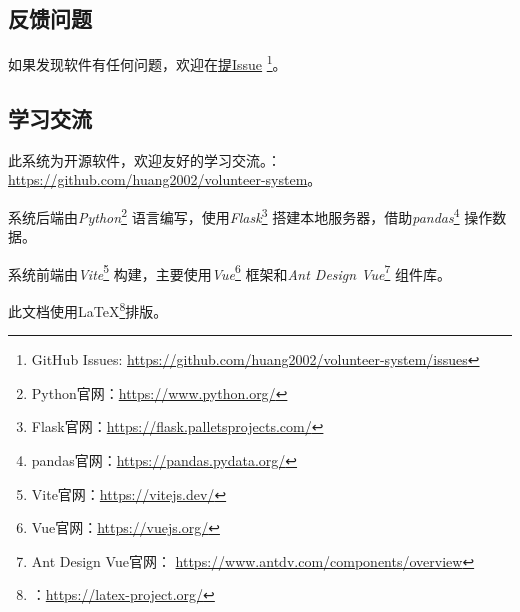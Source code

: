 \documentclass[12pt,titlepage]{article}
\newcommand{\githuburl}{https://github.com/huang2002/volunteer-system}
\newcommand{\issuesurl}{\githuburl/issues}
\newcommand{\Python}{\textit{Python}}
\newcommand{\GitHub}{\textit{GitHub}}
\begin{document}
\subsection{反馈问题}
\label{subsec:report}

如果发现软件有任何问题，欢迎在\href{\issuesurl}{提Issue}
\footnote{GitHub Issues: \url{\issuesurl}}。

\subsection{学习交流}

此系统为开源软件，欢迎友好的学习交流。：\url{\githuburl}。

系统后端由\Python\footnote{Python官网：\url{https://www.python.org/}}
语言编写，使用\textit{Flask}\footnote{Flask官网：\url{https://flask.palletsprojects.com/}}
搭建本地服务器，借助\textit{pandas}\footnote{pandas官网：\url{https://pandas.pydata.org/}}
操作数据。

系统前端由\textit{Vite}\footnote{Vite官网：\url{https://vitejs.dev/}}
构建，主要使用\textit{Vue}\footnote{Vue官网：\url{https://vuejs.org/}}
框架和\textit{Ant Design Vue}\footnote{Ant Design Vue官网：%
    \url{https://www.antdv.com/components/overview}}
组件库。

此文档使用\LaTeX\footnote{：\url{https://latex-project.org/}}排版。
\end{document}
